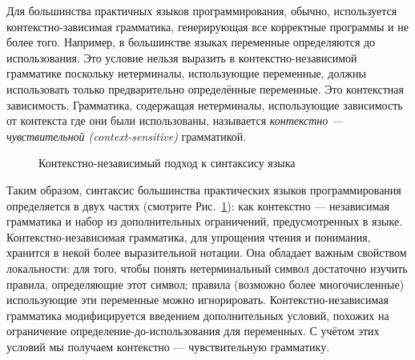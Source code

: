 Для большинства практичных языков программирования, обычно, используется контекстно-зависимая грамматика, генерирующая все корректные программы и не более того. Например, в большинстве языках переменные определяются до использования. Это условие нельзя выразить в контекстно-независимой грамматике поскольку нетерминалы, использующие переменные, должны использовать только предварительно определённые переменные. Это контекстная зависимость. Грамматика, содержащая нетерминалы, использующие зависимость от контекста где они были использованы, называется \emph{контекстно --- чувствительной (context-sensitive)} грамматикой.

\begin{figure}
\caption{Контекстно-независимый подход к синтаксису языка}
\label{figure:context-free_approach}
\end{figure}

Таким образом, синтаксис большинства практических языков программирования определяется в двух частях (смотрите Рис.~\ref{figure:context-free_approach}): как контекстно --- независимая грамматика и набор из дополнительных ограничений, предусмотренных в языке. Контекстно-независимая грамматика, для упрощения чтения и понимания, хранится в некой более выразительной нотации. Она обладает важным свойством локальности: для того, чтобы понять нетерминальный символ достаточно изучить правила, определяющие этот символ; правила (возможно более многочисленные) использующие эти переменные можно игнорировать. Контекстно-независимая грамматика модифицируется введением дополнительных условий, похожих на ограничение определение-до-использования для переменных. С учётом этих условий мы получаем контекстно --- чувствительную грамматику.

